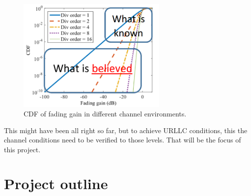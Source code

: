 \begin{figure}[H]
\centering
\includegraphics[width=0.65\textwidth]{figures/fading_gain.png}
\caption{\Gls{CDF} of fading gain in different channel environments.}
\label{fading_gain}
\end{figure}

This might have been all right so far, but to achieve URLLC conditions, this the channel conditions need to be verified to those levels. That will be the focus of this project.


\section{Project outline}




